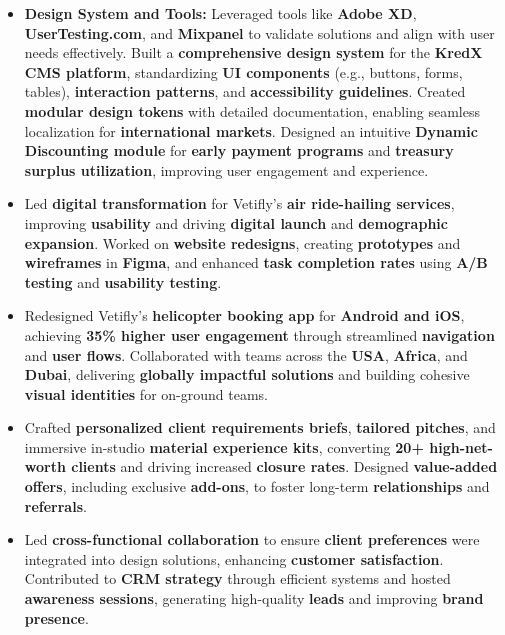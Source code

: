 \documentclass[10pt,a4paper,ragged2e,withhyper]{altacv}
\begin{document}
\begin{paracol}{2}
\begin{itemize}
    \item \textbf{Design System and Tools:} Leveraged tools like \textbf{Adobe XD}, \textbf{UserTesting.com}, and \textbf{Mixpanel} to validate solutions and align with user needs effectively. Built a \textbf{comprehensive design system} for the \textbf{KredX CMS platform}, standardizing \textbf{UI components} (e.g., buttons, forms, tables), \textbf{interaction patterns}, and \textbf{accessibility guidelines}. Created \textbf{modular design tokens} with detailed documentation, enabling seamless localization for \textbf{international markets}. Designed an intuitive \textbf{Dynamic Discounting module} for \textbf{early payment programs} and \textbf{treasury surplus utilization}, improving user engagement and experience.
\end{itemize}

\divider

\begin{itemize}
  \item Led \textbf{digital transformation} for Vetifly’s \textbf{air ride-hailing services}, improving \textbf{usability} and driving \textbf{digital launch} and \textbf{demographic expansion}. Worked on \textbf{website redesigns}, creating \textbf{prototypes} and \textbf{wireframes} in \textbf{Figma}, and enhanced \textbf{task completion rates} using \textbf{A/B testing} and \textbf{usability testing}.
  \item Redesigned Vetifly’s \textbf{helicopter booking app} for \textbf{Android and iOS}, achieving \textbf{35\% higher user engagement} through streamlined \textbf{navigation} and \textbf{user flows}. Collaborated with teams across the \textbf{USA}, \textbf{Africa}, and \textbf{Dubai}, delivering \textbf{globally impactful solutions} and building cohesive \textbf{visual identities} for on-ground teams.
\end{itemize}



\divider

\begin{itemize}
  \item Crafted \textbf{personalized client requirements briefs}, \textbf{tailored pitches}, and immersive in-studio \textbf{material experience kits}, converting \textbf{20+ high-net-worth clients} and driving increased \textbf{closure rates}. Designed \textbf{value-added offers}, including exclusive \textbf{add-ons}, to foster long-term \textbf{relationships} and \textbf{referrals}.
  \item Led \textbf{cross-functional collaboration} to ensure \textbf{client preferences} were integrated into design solutions, enhancing \textbf{customer satisfaction}. Contributed to \textbf{CRM strategy} through efficient systems and hosted \textbf{awareness sessions}, generating high-quality \textbf{leads} and improving \textbf{brand presence}.
\end{itemize}


\end{paracol}
\end{document}

